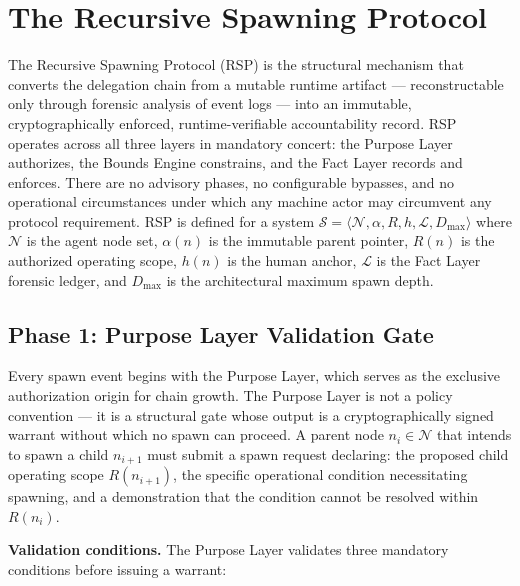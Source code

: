 \section{The Recursive Spawning Protocol}
\label{sec:rs-protocol}

The Recursive Spawning Protocol (RSP) is the structural mechanism that converts the delegation chain from a mutable runtime artifact — reconstructable only through forensic analysis of event logs — into an immutable, cryptographically enforced, runtime-verifiable accountability record. RSP operates across all three \bxthree{} layers in mandatory concert: the Purpose Layer authorizes, the Bounds Engine constrains, and the Fact Layer records and enforces. There are no advisory phases, no configurable bypasses, and no operational circumstances under which any machine actor may circumvent any protocol requirement. RSP is defined for a system $\mathcal{S} = \langle \mathcal{N}, \alpha, R, h, \mathcal{L}, D_{\max} \rangle$ where $\mathcal{N}$ is the agent node set, $\alpha(n)$ is the immutable parent pointer, $R(n)$ is the authorized operating scope, $h(n)$ is the human anchor, $\mathcal{L}$ is the Fact Layer forensic ledger, and $D_{\max}$ is the architectural maximum spawn depth.

\subsection{Phase 1: Purpose Layer Validation Gate}

Every spawn event begins with the Purpose Layer, which serves as the exclusive authorization origin for chain growth. The Purpose Layer is not a policy convention — it is a structural gate whose output is a cryptographically signed warrant without which no spawn can proceed. A parent node $n_i \in \mathcal{N}$ that intends to spawn a child $n_{i+1}$ must submit a spawn request declaring: the proposed child operating scope $R(n_{i+1})$, the specific operational condition necessitating spawning, and a demonstration that the condition cannot be resolved within $R(n_i)$.

\medskip
\noindent\textbf{Validation conditions.} The Purpose Layer validates three mandatory conditions before issuing a warrant:


